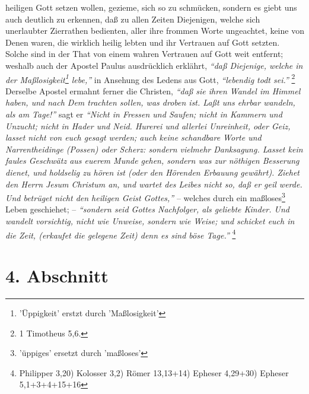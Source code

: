 heiligen Gott setzen wollen, gezieme, sich so zu schmücken, sondern es giebt uns
auch deutlich zu erkennen, daß zu allen Zeiten Diejenigen, welche sich
unerlaubter Zierrathen bedienten, aller ihre frommen Worte ungeachtet, keine von
Denen waren, die wirklich heilig lebten und ihr Vertrauen auf Gott setzten.
Solche sind in der That von einem wahren Vertrauen auf Gott weit entfernt;
weshalb auch der Apostel Paulus ausdrücklich erklährt,
\textit{"`daß Diejenige, welche
in der Maßlosigkeit\footnote{'Üppigkeit' erstzt durch 'Maßlosigkeit'} lebe,"'} in Ansehung des Ledens aus Gott,
\textit{"`lebendig todt sei."'}
\footnote{1 Timotheus 5,6.}
Derselbe Apostel ermahnt ferner die Christen,
\textit{"`daß sie ihren Wandel im Himmel haben, und nach Dem trachten sollen, was droben
ist. Laßt uns ehrbar wandeln, als am Tage!"'} sagt er
\textit{"`Nicht in Fressen und
Saufen; nicht in Kammern und Unzucht; nicht in Hader und Neid. Hurerei und
allerlei Unreinheit, oder Geiz, lasset nicht von euch gesagt werden; auch keine
schandbare Worte und Narrentheidinge (Possen) oder Scherz: sondern vielmehr
Danksagung. Lasset kein faules Geschwätz aus euerem Munde gehen, sondern was zur
nöthigen Besserung dienet, und holdselig zu hören ist (oder den Hörenden
Erbauung gewährt). Ziehet den Herrn Jesum Christum an, und wartet des Leibes
nicht so, daß er geil werde. Und betrüget nicht den heiligen Geist Gottes,"'} --
welches durch ein maßloses\footnote{'üppiges' ersetzt durch 'maßloses'} Leben geschiehet; --
\textit{"`sondern seid Gottes Nachfolger,
als geliebte Kinder. Und wandelt vorsichtig, nicht wie Unweise, sondern wie
Weise; und schicket euch in die Zeit, (erkaufet die gelegene Zeit) denn es sind
böse Tage."'}
\footnote{Philipper 3,20)  Kolosser 3,2)  Römer 13,13+14) Epheser 4,29+30) Epheser 5,1+3+4+15+16}

\section{4. Abschnitt} \label{kap15_ab4}

